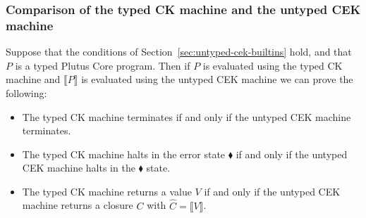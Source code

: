 \documentclass[a4paper]{article}
\newcommand\discharge[1]{\widehat{#1}}
\newcommand{\erase}[1]{\llbracket#1\rrbracket}
\begin{document}
\begin{appendices}
\subsubsection{Comparison of the typed CK machine and the untyped CEK machine}
Suppose that the conditions of Section~\ref{sec:untyped-cek-builtins}
hold, and that $P$ is a typed Plutus Core program.  Then if $P$ is
evaluated using the typed CK machine and $\erase{P}$ is evaluated
using the untyped CEK machine we can prove the following:
\begin{itemize}
\item The typed CK machine terminates if and only if the untyped CEK machine terminates.
\item The typed CK machine halts in the error state $\blacklozenge$ if and only if
the untyped CEK machine halts in the $\blacklozenge$ state.
\item The typed CK machine returns a value $V$ if and only if the untyped CEK machine returns a
closure $C$ with $\discharge{C} = \erase{V}$.
\end{itemize}

\end{appendices}


\end{document}
